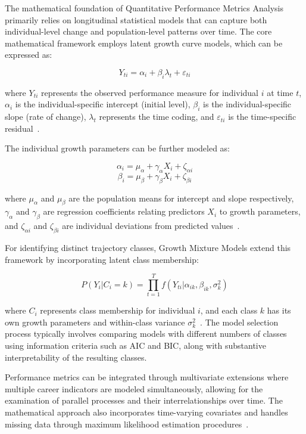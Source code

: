 \documentclass[main.tex]{subfiles}
\begin{document}
The mathematical foundation of Quantitative Performance Metrics Analysis primarily relies on longitudinal statistical models that can capture both individual-level change and population-level patterns over time. The core mathematical framework employs latent growth curve models, which can be expressed as:

$$Y_{ti} = \alpha_i + \beta_i \lambda_t + \varepsilon_{ti}$$

where $Y_{ti}$ represents the observed performance measure for individual $i$ at time $t$, $\alpha_i$ is the individual-specific intercept (initial level), $\beta_i$ is the individual-specific slope (rate of change), $\lambda_t$ represents the time coding, and $\varepsilon_{ti}$ is the time-specific residual~\parencite{latent_growth_columbia,residual_gmm}.

The individual growth parameters can be further modeled as:

$$\alpha_i = \mu_\alpha + \gamma_\alpha X_i + \zeta_{\alpha i}$$
$$\beta_i = \mu_\beta + \gamma_\beta X_i + \zeta_{\beta i}$$

where $\mu_\alpha$ and $\mu_\beta$ are the population means for intercept and slope respectively, $\gamma_\alpha$ and $\gamma_\beta$ are regression coefficients relating predictors $X_i$ to growth parameters, and $\zeta_{\alpha i}$ and $\zeta_{\beta i}$ are individual deviations from predicted values~\parencite{work_trajectories,job_satisfaction}.

For identifying distinct trajectory classes, Growth Mixture Models extend this framework by incorporating latent class membership:

$$P(Y_i | C_i = k) = \prod_{t=1}^T f(Y_{ti} | \alpha_{ik}, \beta_{ik}, \sigma^2_{k})$$

where $C_i$ represents class membership for individual $i$, and each class $k$ has its own growth parameters and within-class variance $\sigma^2_{k}$~\parencite{residual_gmm,gmm_resilience}. The model selection process typically involves comparing models with different numbers of classes using information criteria such as AIC and BIC, along with substantive interpretability of the resulting classes.

Performance metrics can be integrated through multivariate extensions where multiple career indicators are modeled simultaneously, allowing for the examination of parallel processes and their interrelationships over time. The mathematical approach also incorporates time-varying covariates and handles missing data through maximum likelihood estimation procedures~\parencite{performance_iot,longitudinal_hpc}.
\end{document}
